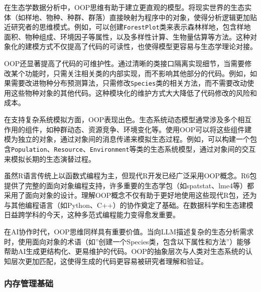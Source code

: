 \documentclass[
]{book}
\begin{document}
在生态学数据分析中，OOP思维有助于建立更直观的模型。将现实世界的生态实体（如样地、物种、种群、群落）直接映射为程序中的对象，使得分析逻辑更加贴近研究者的思维模式。例如，可以创建\texttt{ForestPlot}类来表示森林样地，包含样地面积、物种组成、环境因子等属性，以及多样性计算、生物量估算等方法。这种对象化的建模方式不仅提高了代码的可读性，也使得模型更容易与生态学理论对接。

OOP还显著提高了代码的可维护性。通过清晰的类接口隔离实现细节，当需要修改某个功能时，只需关注相关类的内部实现，而不影响其他部分的代码。例如，如果需要改进物种分布预测算法，只需修改\texttt{Species}类的相关方法，而不需要改动使用这些物种对象的其他代码。这种模块化的维护方式大大降低了代码修改的风险和成本。

在支持复杂系统模拟方面，OOP表现出色。生态系统动态模型通常涉及多个相互作用的组件，如种群动态、资源竞争、环境变化等。使用OOP可以将这些组件建模为独立的对象，通过对象间的消息传递来模拟生态过程。例如，可以构建一个包含\texttt{Population}、\texttt{Resource}、\texttt{Environment}等类的生态系统模型，通过对象间的交互来模拟长期的生态演替过程。

虽然R语言传统上以函数式编程为主，但现代R开发已经广泛采用OOP概念。R6包提供了完整的面向对象编程支持，许多重要的生态学包（如spatstat、lme4等）都采用了面向对象的设计。理解OOP概念不仅有助于更好地使用这些现代R包，还为与其他编程语言（如Python、C++）的协作奠定了基础。在数据科学和生态建模日益跨学科的今天，这种多范式编程能力变得愈发重要。

在AI协作时代，OOP思维同样具有重要价值。当向LLM描述复杂的生态分析需求时，使用面向对象的术语（如''创建一个Species类，包含以下属性和方法''）能够帮助AI生成更结构化、更易维护的代码。OOP的抽象层次与人类对生态系统的认知层次更加匹配，这使得生成的代码更容易被研究者理解和验证。

\hypertarget{ux5185ux5b58ux7ba1ux7406ux57faux7840}{%
\subsubsection{内存管理基础}\label{ux5185ux5b58ux7ba1ux7406ux57faux7840}}
\end{document}
